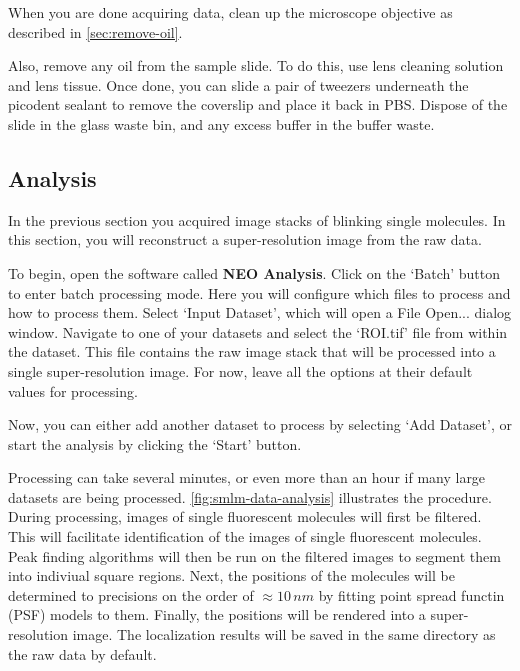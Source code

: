 \documentclass[10pt,a4paper,oneside]{book}
\begin{document}
\newline

When you are done acquiring data, clean up the microscope objective as described in \autoref{sec:remove-oil}.

Also, remove any oil from the sample slide. To do this, use lens cleaning solution and lens tissue. Once done, you can slide a pair of tweezers underneath the picodent sealant to remove the coverslip and place it back in PBS. Dispose of the slide in the glass waste bin, and any excess buffer in the buffer waste.

\subsection{Analysis}

In the previous section you acquired image stacks of blinking single molecules. In this section, you will reconstruct a super-resolution image from the raw data.

To begin, open the software called \textbf{NEO Analysis}. Click on the `Batch' button to enter batch processing mode. Here you will configure which files to process and how to process them. Select `Input Dataset', which will open a File Open... dialog window. Navigate to one of your datasets and select the `ROI.tif' file from within the dataset. This file contains the raw image stack that will be processed into a single super-resolution image. For now, leave all the options at their default values for processing.

Now, you can either add another dataset to process by selecting `Add Dataset', or start the analysis by clicking the `Start' button.

Processing can take several minutes, or even more than an hour if many large datasets are being processed. \autoref{fig:smlm-data-analysis} illustrates the procedure. During processing, images of single fluorescent molecules will first be filtered. This will facilitate identification of the images of single fluorescent molecules. Peak finding algorithms will then be run on the filtered images to segment them into indiviual square regions. Next, the positions of the molecules will be determined to precisions on the order of $\approx 10 \, nm$ by fitting point spread functin (PSF) models to them. Finally, the positions will be rendered into a super-resolution image. The localization results will be saved in the same directory as the raw data by default.
\end{document}
